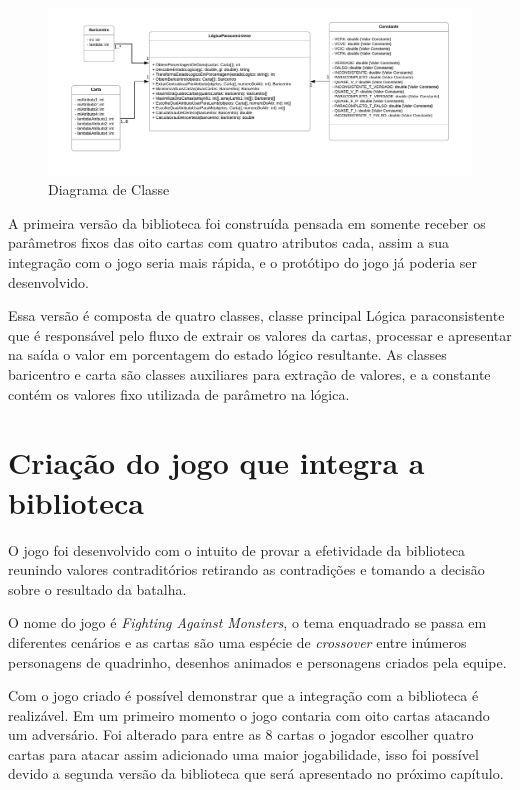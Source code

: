 \begin{figure}[htb]
	\caption{
		\label{fig:classelpa} 
		Diagrama de Classe
	}
	\begin{center}
		\includegraphics[scale=0.7]{imagens/classelpa.png}
	\end{center}
\end{figure}

\newpage

A primeira versão da biblioteca foi construída pensada em somente receber os parâmetros fixos das oito cartas com quatro atributos cada, assim a sua integração com o jogo seria mais rápida, e o protótipo do jogo já poderia ser desenvolvido.

Essa versão é composta de quatro classes, classe principal Lógica paraconsistente que é responsável pelo fluxo de extrair os valores da cartas, processar e apresentar na saída o valor em porcentagem do estado lógico resultante. As classes baricentro e carta são classes auxiliares para extração de valores, e a constante contém os valores fixo utilizada de parâmetro na lógica.

\section{Criação do jogo que integra a biblioteca}

O jogo foi desenvolvido com o intuito de provar a efetividade da biblioteca reunindo valores contraditórios retirando as contradições e tomando a decisão sobre o resultado da batalha.

O nome do jogo é \textit{Fighting Against Monsters}, o tema enquadrado se passa em diferentes cenários e as cartas são uma espécie de \textit{crossover} entre inúmeros personagens de quadrinho, desenhos animados e personagens criados pela equipe.

Com o jogo criado é possível demonstrar que a integração com a biblioteca é realizável. Em um primeiro momento o jogo contaria com oito cartas atacando um adversário. Foi alterado para entre as 8 cartas o jogador escolher quatro cartas para atacar assim adicionado uma maior jogabilidade, isso foi possível devido a segunda versão da biblioteca que será apresentado no próximo capítulo.

